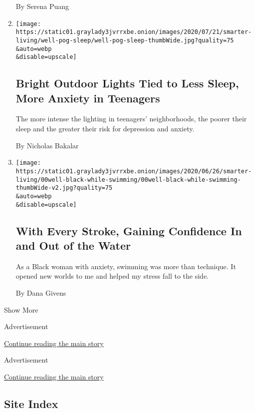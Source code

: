 \begin{enumerate}
  By Serena Puang
\item
  \href{/2020/07/13/well/mind/bright-outdoor-lights-tied-to-less-sleep-more-anxiety-in-teenagers.html}{}

  \texttt{[image: https://static01.graylady3jvrrxbe.onion/images/2020/07/21/smarter-living/well-pog-sleep/well-pog-sleep-thumbWide.jpg?quality=75\\\&auto=webp\\\&disable=upscale]}

  \hypertarget{bright-outdoor-lights-tied-to-less-sleep-more-anxiety-in-teenagers}{%
  \subsection{Bright Outdoor Lights Tied to Less Sleep, More Anxiety in
  Teenagers}\label{bright-outdoor-lights-tied-to-less-sleep-more-anxiety-in-teenagers}}

  The more intense the lighting in teenagers' neighborhoods, the poorer
  their sleep and the greater their risk for depression and anxiety.

  By Nicholas Bakalar
\item
  \href{/2020/07/07/well/mind/swimming-anxiety-race-mental-health.html}{}

  \texttt{[image: https://static01.graylady3jvrrxbe.onion/images/2020/06/26/smarter-living/00well-black-while-swimming/00well-black-while-swimming-thumbWide-v2.jpg?quality=75\\\&auto=webp\\\&disable=upscale]}

  \hypertarget{with-every-stroke-gaining-confidence-in-and-out-of-the-water}{%
  \subsection{With Every Stroke, Gaining Confidence In and Out of the
  Water}\label{with-every-stroke-gaining-confidence-in-and-out-of-the-water}}

  As a Black woman with anxiety, swimming was more than technique. It
  opened new worlds to me and helped my stress fall to the side.

  By Dana Givens
\end{enumerate}

Show More

Advertisement

\protect\hyperlink{after-mid2}{Continue reading the main story}

Advertisement

\protect\hyperlink{after-mktg}{Continue reading the main story}

\hypertarget{site-index}{%
\subsection{Site Index}\label{site-index}}

